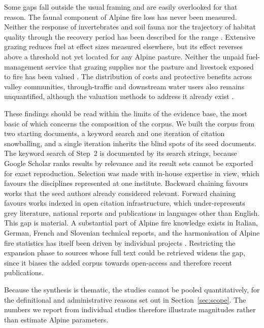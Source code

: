 \documentclass[11pt,a4paper]{article}
\begin{document}
Some gaps fall outside the usual framing and are easily overlooked for that reason. The faunal component of Alpine fire loss has never been measured. Neither the response of invertebrates and soil fauna nor the trajectory of habitat quality through the recovery period has been described for the range \citep{rey_effects_2019, degiuli_arrested_2024, arrogantefunes_mapping_2024}. Extensive grazing reduces fuel at effect sizes measured elsewhere, but its effect reverses above a threshold not yet located for any Alpine pasture. Neither the unpaid fuel-management service that grazing supplies nor the pasture and livestock exposed to fire has been valued \citep{xu_how_2026}. The distribution of costs and protective benefits across valley communities, through-traffic and downstream water users also remains unquantified, although the valuation methods to address it already exist \citep{accastello_asforesee_2019, moos_climate_2021}.

\label{sec:limitations}
These findings should be read within the limits of the evidence base, the most basic of which concerns the composition of the corpus. We built the corpus from two starting documents, a keyword search and one iteration of citation snowballing, and a single iteration inherits the blind spots of its seed documents. The keyword search of Step~2 is documented by its search strings, because Google Scholar ranks results by relevance and its result sets cannot be exported for exact reproduction. Selection was made with in-house expertise in view, which favours the disciplines represented at one institute. Backward chaining favours works that the seed authors already considered relevant. Forward chaining favours works indexed in open citation infrastructure, which under-represents grey literature, national reports and publications in languages other than English. This gap is material. A substantial part of Alpine fire knowledge exists in Italian, German, French and Slovenian technical reports, and the harmonisation of Alpine fire statistics has itself been driven by individual projects \citep{valese_wildfires_2011}. Restricting the expansion phase to sources whose full text could be retrieved widens the gap, since it biases the added corpus towards open-access and therefore recent publications.

Because the synthesis is thematic, the studies cannot be pooled quantitatively, for the definitional and administrative reasons set out in Section~\ref{sec:scope}. The numbers we report from individual studies therefore illustrate magnitudes rather than estimate Alpine parameters.
\end{document}
